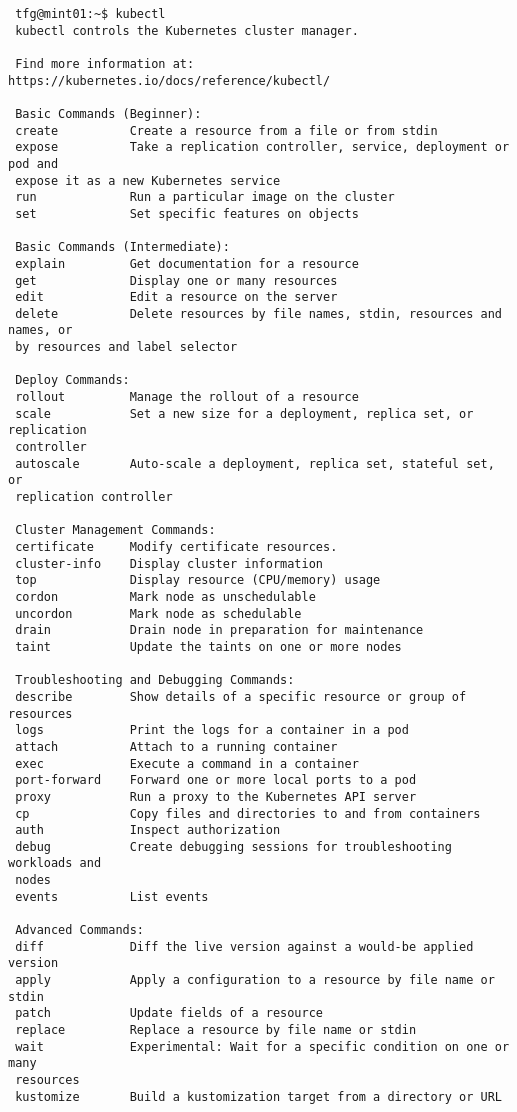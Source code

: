 \documentclass[../main.tex]{subfiles}
\begin{document}
\begin{lstlisting}     
 tfg@mint01:~$ kubectl 
 kubectl controls the Kubernetes cluster manager.
 
 Find more information at: https://kubernetes.io/docs/reference/kubectl/
 
 Basic Commands (Beginner):
 create          Create a resource from a file or from stdin
 expose          Take a replication controller, service, deployment or pod and
 expose it as a new Kubernetes service
 run             Run a particular image on the cluster
 set             Set specific features on objects
 
 Basic Commands (Intermediate):
 explain         Get documentation for a resource
 get             Display one or many resources
 edit            Edit a resource on the server
 delete          Delete resources by file names, stdin, resources and names, or
 by resources and label selector
 
 Deploy Commands:
 rollout         Manage the rollout of a resource
 scale           Set a new size for a deployment, replica set, or replication
 controller
 autoscale       Auto-scale a deployment, replica set, stateful set, or
 replication controller
 
 Cluster Management Commands:
 certificate     Modify certificate resources.
 cluster-info    Display cluster information
 top             Display resource (CPU/memory) usage
 cordon          Mark node as unschedulable
 uncordon        Mark node as schedulable
 drain           Drain node in preparation for maintenance
 taint           Update the taints on one or more nodes
 
 Troubleshooting and Debugging Commands:
 describe        Show details of a specific resource or group of resources
 logs            Print the logs for a container in a pod
 attach          Attach to a running container
 exec            Execute a command in a container
 port-forward    Forward one or more local ports to a pod
 proxy           Run a proxy to the Kubernetes API server
 cp              Copy files and directories to and from containers
 auth            Inspect authorization
 debug           Create debugging sessions for troubleshooting workloads and
 nodes
 events          List events
 
 Advanced Commands:
 diff            Diff the live version against a would-be applied version
 apply           Apply a configuration to a resource by file name or stdin
 patch           Update fields of a resource
 replace         Replace a resource by file name or stdin
 wait            Experimental: Wait for a specific condition on one or many
 resources
 kustomize       Build a kustomization target from a directory or URL
 

\end{lstlisting}
\end{document}
